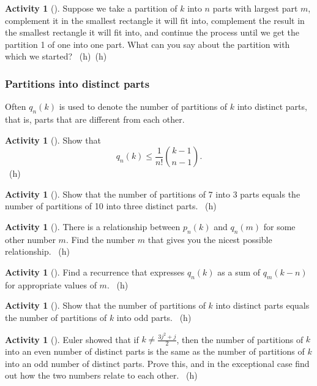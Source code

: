 \documentclass[10pt,]{book}
\theoremstyle{plain}
\theoremstyle{definition}
\theoremstyle{definition}
\theoremstyle{definition}
\newtheorem{activity}[project]{Activity}
\numberwithin{equation}{chapter}
\begin{document}
\begin{activity}[]\label{activity-302}
\hypertarget{p-1531}{}%
Suppose we take a partition of \(k\) into \(n\) parts with largest part \(m\), complement it in the smallest rectangle it will fit into, complement the result in the smallest rectangle it will fit into, and continue the process until we get the partition 1 of one into one part.  What can you say about the partition with which we started?%
~{\tiny (h)}~{\tiny (h)}\end{activity}
\typeout{************************************************}
\typeout{************************************************}
\subsubsection[{Partitions into distinct parts}]{Partitions into distinct parts}\label{subsubsection-1}
\hypertarget{p-1538}{}%
Often \(q_n(k)\) is used to denote the number of partitions of \(k\) into distinct parts, that is, parts that are different from each other.%
\begin{activity}[]\label{activity-303}
\hypertarget{p-1539}{}%
Show that%
\begin{equation*}
q_n(k) \le \frac{1}{n!}\binom{k-1}{n-1}.
\end{equation*}
%
~{\tiny (h)}\end{activity}
\begin{activity}[]\label{activity-304}
\hypertarget{p-1542}{}%
Show that the number of partitions of 7 into 3 parts equals the number of partitions of 10 into three distinct parts.%
~{\tiny (h)}\end{activity}
\begin{activity}[]\label{activity-305}
\hypertarget{p-1545}{}%
There is a relationship between \(p_n(k)\) and \(q_n(m)\) for some other number \(m\). Find the number \(m\) that gives you the nicest possible relationship.%
~{\tiny (h)}\end{activity}
\begin{activity}[]\label{activity-306}
\hypertarget{p-1548}{}%
Find a recurrence that expresses \(q_n(k)\) as a sum of \(q_m(k-n)\) for appropriate values of \(m\).%
~{\tiny (h)}\end{activity}
\begin{activity}[]\label{activity-307}
\hypertarget{p-1551}{}%
Show that the number of partitions of \(k\) into distinct parts equals the number of partitions of \(k\) into odd parts.%
~{\tiny (h)}\end{activity}
\begin{activity}[]\label{activity-308}
\hypertarget{p-1555}{}%
Euler showed that if \(k\not= \frac{3j^2+j}{2}\), then the number of partitions of \(k\) into an even number of distinct parts is the same as the number of partitions of \(k\) into an odd number of distinct parts. Prove this, and in the exceptional case find out how the two numbers relate to each other.%
~{\tiny (h)}\end{activity}
\typeout{************************************************}
\typeout{************************************************}
\end{document}
